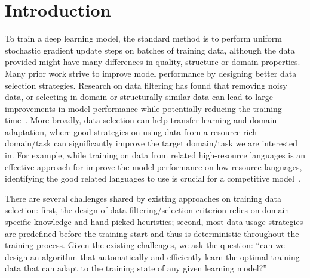\section{\label{sec:intro} Introduction}
To train a deep learning model, the standard method is to perform uniform stochastic gradient update steps on batches of training data, although the data provided might have many differences in quality, structure or domain properties. Many prior work strive to improve model performance by designing better data selection strategies. Research on data filtering has found that removing noisy data, or selecting in-domain or structurally similar data can lead to large improvements in model performance while potentially reducing the training time~\citep{jiang-zhai-2007-instance,wang-etal-2017-instance,axelrod2011domain,foster-etal-2010-discriminative,moore2010intelligent}. More broadly, data selection can help transfer learning and domain adaptation, where good strategies on using data from a resource rich domain/task can significantly improve the target domain/task we are interested in. For example, while training on data from related high-resource languages is an effective approach for improve the model performance on low-resource languages, identifying the good related languages to use is crucial for a competitive model~\citep{TCS}. 

There are several challenges shared by existing approaches on training data selection: first, the design of data filtering/selection criterion relies on domain-specific knowledge and hand-picked heuristics; second, most data usage strategies are predefined before the training start and thus is deterministic throughout the training process. 
Given the existing challenges, we ask the question: ``can we design an algorithm that automatically and efficiently learn the optimal training data that can adapt to the training state of any given learning model?''

